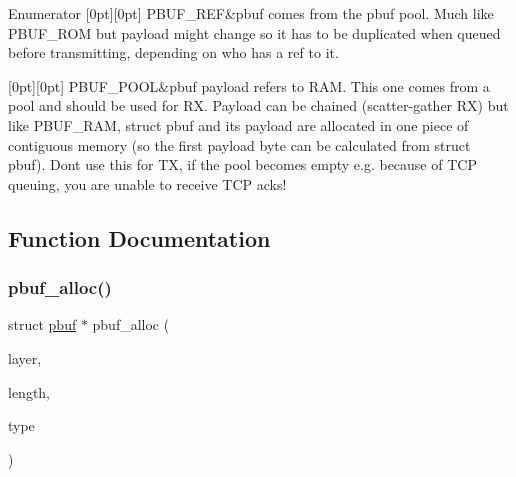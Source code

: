 \begin{DoxyEnumFields}{Enumerator}
[0pt][0pt]{}\mbox{\label{group__pbuf_ggab7e0e32fcc292c0d7107721766ed92fbac9b6ba960fdea6f2e8f35c8313b77e4e}} 
P\+B\+U\+F\+\_\+\+R\+EF&pbuf comes from the pbuf pool. Much like P\+B\+U\+F\+\_\+\+R\+OM but payload might change so it has to be duplicated when queued before transmitting, depending on who has a \textquotesingle{}ref\textquotesingle{} to it. \\
\hline

[0pt][0pt]{}\mbox{\label{group__pbuf_ggab7e0e32fcc292c0d7107721766ed92fbae969347127387b9b59a23ccd24b76d21}} 
P\+B\+U\+F\+\_\+\+P\+O\+OL&pbuf payload refers to R\+AM. This one comes from a pool and should be used for RX. Payload can be chained (scatter-\/gather RX) but like P\+B\+U\+F\+\_\+\+R\+AM, struct pbuf and its payload are allocated in one piece of contiguous memory (so the first payload byte can be calculated from struct pbuf). Don\textquotesingle{}t use this for TX, if the pool becomes empty e.\+g. because of T\+CP queuing, you are unable to receive T\+CP acks! \\
\hline

\end{DoxyEnumFields}


\subsection{Function Documentation}
\mbox{\label{group__pbuf_ga8bb9c5d54a06995b1c67ce695ead9969}} 
\subsubsection{\texorpdfstring{pbuf\+\_\+alloc()}{pbuf\_alloc()}}
{\footnotesize\ttfamily struct \hyperlink{structpbuf}{pbuf} $\ast$ pbuf\+\_\+alloc (\begin{DoxyParamCaption}\item[{\hyperlink{group__pbuf_gaee1baa59bb2f85ba575b5a8619ac1ebf}{pbuf\+\_\+layer}}]{layer,  }\item[{\hyperlink{group__compiler__abstraction_ga77570ac4fcab86864fa1916e55676da2}{u16\+\_\+t}}]{length,  }\item[{\hyperlink{group__pbuf_gab7e0e32fcc292c0d7107721766ed92fb}{pbuf\+\_\+type}}]{type }\end{DoxyParamCaption})}

